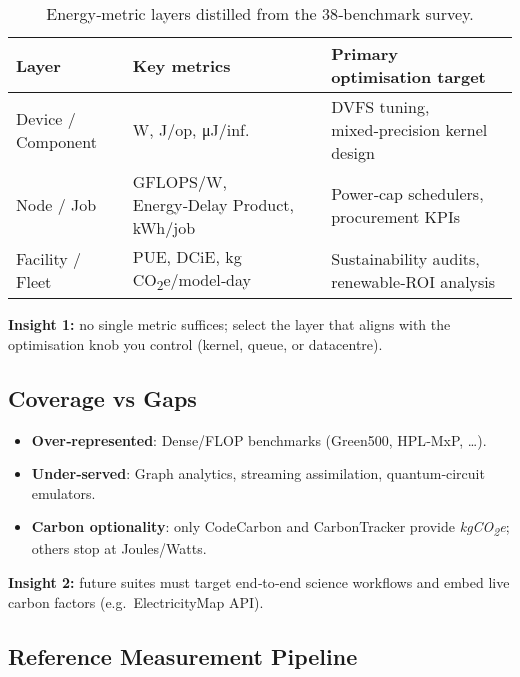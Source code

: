 \begin{table}[ht]
  \centering
  \caption{Energy‑metric layers distilled from the 38‑benchmark survey.}
  \label{tab:metric_layers}
  \footnotesize
  \renewcommand{\arraystretch}{1.05}
  \setlength{\tabcolsep}{3pt}
  \begin{tabularx}{\columnwidth}{@{} l X X @{}}
    \toprule
    \textbf{Layer} & \textbf{Key metrics} & \textbf{Primary optimisation target} \\ \midrule
    Device / Component & W, J/op, \si{\micro\joule}/inf. & DVFS tuning, mixed‑precision kernel design \\ 
    Node / Job        & GFLOPS/W, Energy‑Delay Product, kWh/job & Power‑cap schedulers, procurement KPIs \\ 
    Facility / Fleet  & PUE, DCiE, kg CO\textsubscript{2}e/model‑day & Sustainability audits, renewable‑ROI analysis \\ \bottomrule
  \end{tabularx}
\end{table}

\textbf{Insight 1:} no single metric suffices; select the layer that aligns
with the optimisation knob you control (kernel, queue, or datacentre).

\subsection{Coverage vs Gaps}

\begin{itemize}
  \item \textbf{Over‑represented}: Dense/FLOP benchmarks (Green500, HPL‑MxP, \dots).
  \item \textbf{Under‑served}: Graph analytics, streaming assimilation, quantum‑circuit emulators.
  \item \textbf{Carbon optionality}: only CodeCarbon and CarbonTracker provide \textit{kgCO\textsubscript{2}e}; others stop at Joules/Watts.
\end{itemize}

\textbf{Insight 2:} future suites must target end‑to‑end science workflows and
embed live carbon factors (e.g.\ ElectricityMap API).

\subsection{Reference Measurement Pipeline}



